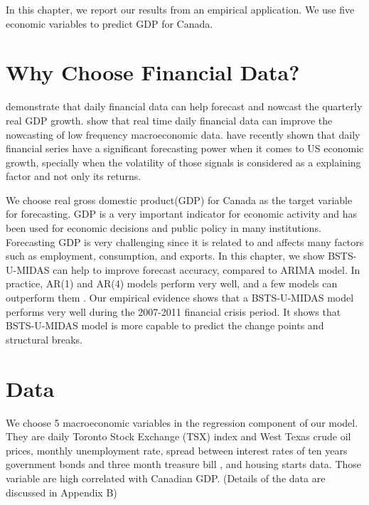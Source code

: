 \label{chapter:Exp}

In this chapter, we  report our results from an empirical application. We use five economic variables to predict GDP for Canada. 

\section{Why Choose Financial Data?}


 demonstrate that daily financial data can help forecast and nowcast the quarterly real GDP growth.   show that real time daily financial data can improve the nowcasting of low frequency macroeconomic data.    have recently shown that  daily financial series have a significant forecasting power when it comes to  US economic growth, specially when the volatility of those signals is considered as a explaining factor and not only its returns. 


We choose real gross domestic product(GDP) for Canada as the target variable for forecasting. GDP is a very important indicator for economic activity and has been used for economic decisions and public policy in many institutions. Forecasting GDP is very challenging since it is related to and affects many factors such as employment, consumption, and  exports. In this chapter, we show BSTS-U-MIDAS can help to improve forecast accuracy, compared to ARIMA model. In practice, AR(1) and AR(4) models perform very well, and a few models can outperform them \cite{Koopman2013}. Our empirical evidence shows that a BSTS-U-MIDAS model performs very well during the 2007-2011 financial crisis period. It shows that BSTS-U-MIDAS model is more capable to predict the change points and structural breaks.     





\section{Data}

We choose 5 macroeconomic variables in the regression component of our model. They are daily Toronto Stock Exchange (TSX) index and West Texas crude oil prices, monthly unemployment rate, spread between interest rates of ten years government bonds and three month treasure bill , and  housing starts data. Those variable are high correlated with Canadian GDP. (Details of the data are discussed in Appendix B)

